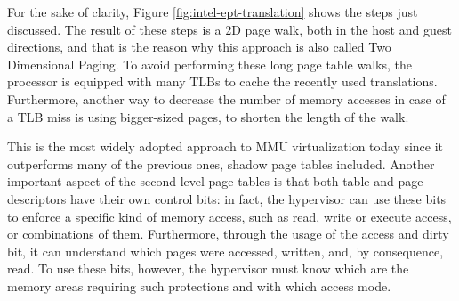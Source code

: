 For the sake of clarity, Figure \ref{fig:intel-ept-translation} shows the steps just discussed. The result of these steps is a 2D page walk, both in the host and guest directions, and that is the reason why this approach is also called Two Dimensional Paging. To avoid performing these long page table walks, the processor is equipped with many TLBs to cache the recently used translations. Furthermore, another way to decrease the number of memory accesses in case of a TLB miss is using bigger-sized pages, to shorten the length of the walk. 
\par 
This is the most widely adopted approach to MMU virtualization today since it outperforms many of the previous ones, shadow page tables included. Another important aspect of the second level page tables is that both table and page descriptors have their own control bits: in fact, the hypervisor can use these bits to enforce a specific kind of memory access, such as read, write or execute access, or combinations of them. Furthermore, through the usage of the access and dirty bit, it can understand which pages were accessed, written, and, by consequence, read. To use these bits, however, the hypervisor must know which are the memory areas requiring such protections and with which access mode. 


